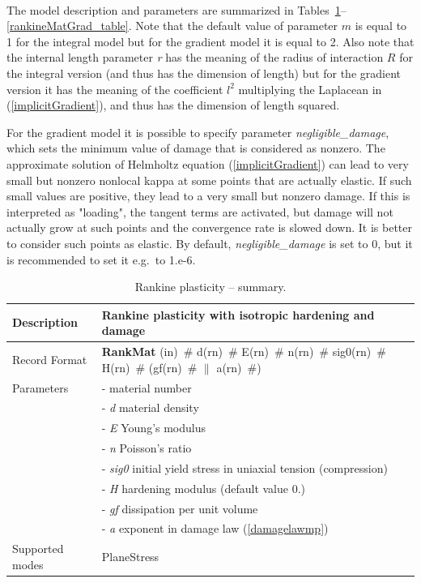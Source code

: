 \documentclass[a4paper]{article}
\newcommand{\descitem}[1]{{\noindent \bf #1}}
\newcommand{\elemparam}[2]{{{#1\tiny (#2)}~\#}}
\newcommand{\param}[1]{{\it #1}}
\begin{document}
\paragraph{}
The model description and parameters are summarized in Tables~\ref{rankineMat_table}--\ref{rankineMatGrad_table}. Note that the default value of parameter $m$ is equal to 1 for the
integral model but for the gradient model it is equal to 2. 
Also note that the internal length parameter \param{r} has the meaning of the
radius of interaction $R$ for the integral version (and thus has the dimension
of length) but for the gradient version it has the meaning of the coefficient $l^2$
multiplying the Laplacean in (\ref{implicitGradient}), and thus has the dimension of length squared.

For the gradient model
it is possible to specify parameter \param{negligible\_damage}, which sets the minimum
value of damage that is considered as nonzero. 
The approximate solution of Helmholtz equation (\ref{implicitGradient}) can lead
    to very small but nonzero nonlocal kappa at some points that
    are actually elastic. If such small values are positive,
    they lead to a very small but nonzero damage. If this is
    interpreted as "loading", the tangent terms are activated,
    but damage will not actually grow at such points and the
    convergence rate is slowed down. It is better to consider
    such points as elastic. By default, \param{negligible\_damage} is set to 0,
but it is recommended to set it e.g.\ to 1.e-6.


\begin{table}[!htb]
\begin{tabular}{|l|p{9cm}|}
\hline
Description & Rankine plasticity with isotropic hardening and damage\\
\hline
Record Format & \descitem{RankMat}  \elemparam{}{in}
\elemparam{d}{rn} \elemparam{E}{rn} \elemparam{n}{rn} \elemparam{sig0}{rn} \elemparam{H}{rn} (\elemparam{gf}{rn} $\|$ \elemparam{a}{rn}) \\
Parameters &- \param{} material number\\
&- \param{d} material density\\
&- \param{E} Young's modulus\\
&- \param{n} Poisson's ratio\\
&- \param{sig0} initial yield stress in uniaxial tension (compression)\\
&- \param{H} hardening modulus (default value 0.)\\
&- \param{gf} dissipation per unit volume\\
&- \param{a} exponent in damage law (\ref{damagelawmp})\\
Supported modes& PlaneStress\\
\hline
\end{tabular}
\caption{Rankine plasticity -- summary.}
\label{rankineMat_table}
\end{table}
\end{document}
